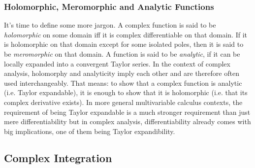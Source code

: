 \subsubsection{Holomorphic, Meromorphic and Analytic Functions}
It's time to define some more jargon. A complex function is said to be \emph{holomorphic} on some domain iff it is complex differentiable on that domain. If it is holomorphic on that domain except for some isolated poles, then it is said to be \emph{meromorphic} on that domain. A function is said to be \emph{analytic}, if it can be locally expanded into a convergent Taylor series. In the context of complex analysis, holomorphy and analyticity imply each other and are therefore often used interchangeably. That means: to show that a complex function is analytic (i.e. Taylor expandable), it is enough to show that it is holomorphic (i.e. that its complex derivative exists). In more general multivariable calculus contexts, the requirement of being Taylor expandable is a much stronger requirement than just mere differentiability but in complex analysis, differentiability already comes with big implications, one of them being Taylor expandibility.







\subsection{Complex Integration}





